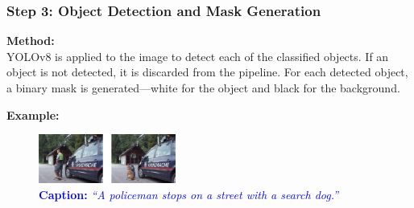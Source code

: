 \documentclass[11pt,letterpaper]{article}
\begin{document}
\subsubsection*{Step 3: Object Detection and Mask Generation}

\noindent
\textbf{Method:} \\
YOLOv8 is applied to the image to detect each of the classified objects. If an object is not detected, it is discarded from the pipeline. For each detected object, a binary mask is generated—white for the object and black for the background.

\noindent
\textbf{Example:}

\begin{figure}[h]
    \centering
    \includegraphics[width=0.4\textwidth]{midterm_report/assets/after_mask.png}
    \caption{\textcolor{blue}{\textbf{Caption:} \emph{``A policeman stops on a street with a search dog.''}}}
    \label{fig:original_image}
\end{figure}
\end{document}
